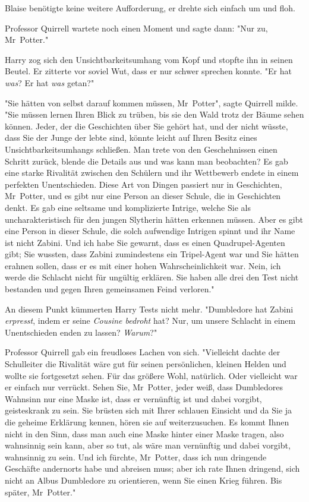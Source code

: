 {Blaise benötigte keine weitere Aufforderung, er drehte sich einfach um und floh.

Professor Quirrell wartete noch einen Moment und sagte dann: "Nur zu, Mr~Potter."

Harry zog sich den Unsichtbarkeitsumhang vom Kopf und stopfte ihn in seinen Beutel. Er zitterte vor soviel Wut, dass er nur schwer sprechen konnte. "Er hat \emph{was}? Er hat \emph{was} getan?"

"Sie hätten von selbst darauf kommen müssen, Mr~Potter", sagte Quirrell milde. "Sie müssen lernen Ihren Blick zu trüben, bis sie den Wald trotz der Bäume sehen können. Jeder, der die Geschichten über Sie gehört hat, und der nicht wüsste, dass Sie der Junge der lebte sind, könnte leicht auf Ihren Besitz eines Unsichtbarkeitsumhangs schließen. Man trete von den Geschehnissen einen Schritt zurück, blende die Details aus und was kann man beobachten? Es gab eine starke Rivalität zwischen den Schülern und ihr Wettbewerb endete in einem perfekten Unentschieden. Diese Art von Dingen passiert nur in Geschichten, Mr~Potter, und es gibt nur eine Person an dieser Schule, die in Geschichten denkt. Es gab eine seltsame und komplizierte Intrige, welche Sie als uncharakteristisch für den jungen Slytherin hätten erkennen müssen. Aber es gibt eine Person in dieser Schule, die solch aufwendige Intrigen spinnt und ihr Name ist nicht Zabini. Und ich habe Sie gewarnt, dass es einen Quadrupel-Agenten gibt; Sie wussten, dass Zabini zumindestens ein Tripel-Agent war und Sie hätten erahnen sollen, dass er es mit einer hohen Wahrscheinlichkeit war. Nein, ich werde die Schlacht nicht für ungültig erklären. Sie haben alle drei den Test nicht bestanden und gegen Ihren gemeinsamen Feind verloren."

An diesem Punkt kümmerten Harry Tests nicht mehr. "Dumbledore hat Zabini \emph{erpresst}, indem er seine \emph{Cousine bedroht} hat? Nur, um unsere Schlacht in einem Unentschieden enden zu lassen? \emph{Warum}?"

Professor Quirrell gab ein freudloses Lachen von sich. "Vielleicht dachte der Schulleiter die Rivalität wäre gut für seinen persönlichen, kleinen Helden und wollte sie fortgesetzt sehen. Für das größere Wohl, natürlich. Oder vielleicht war er einfach nur verrückt. Sehen Sie, Mr~Potter, jeder weiß, dass Dumbledores Wahnsinn nur eine Maske ist, dass er vernünftig ist und dabei vorgibt, geisteskrank zu sein. Sie brüsten sich mit Ihrer schlauen Einsicht und da Sie ja die geheime Erklärung kennen, hören sie auf weiterzusuchen. Es kommt Ihnen nicht in den Sinn, dass man auch eine Maske hinter einer Maske tragen, also wahnsinnig sein kann, aber so tut, als wäre man vernünftig und dabei vorgibt, wahnsinnig zu sein. Und ich fürchte, Mr~Potter, dass ich nun dringende Geschäfte andernorts habe und abreisen muss; aber ich rate Ihnen dringend, sich nicht an Albus Dumbledore zu orientieren, wenn Sie einen Krieg führen. Bis später, Mr~Potter."

}
